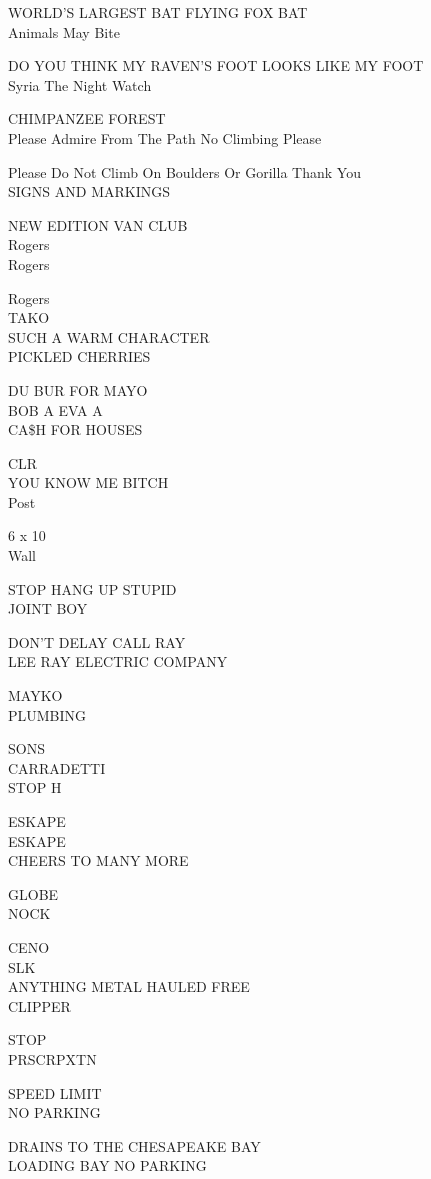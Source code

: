 \documentclass[10pt,letterpaper]{article}
\begin{document}
WORLD'S LARGEST BAT FLYING FOX BAT\\
Animals May Bite

DO YOU THINK MY RAVEN'S FOOT LOOKS LIKE MY FOOT\\
Syria The Night Watch

CHIMPANZEE FOREST\\
Please Admire From The Path No Climbing Please

Please Do Not Climb On Boulders Or Gorilla Thank You\\
SIGNS AND MARKINGS

NEW EDITION VAN CLUB\\
Rogers\\
Rogers

Rogers\\
TAKO\\
SUCH A WARM CHARACTER\\
PICKLED CHERRIES

DU BUR FOR MAYO\\
BOB A EVA A\\
CA\$H FOR HOUSES

CLR\\
YOU KNOW ME BITCH\\
Post

6 x 10\\
Wall

STOP HANG UP STUPID\\
JOINT BOY

DON'T DELAY CALL RAY\\
LEE RAY ELECTRIC COMPANY

MAYKO\\
PLUMBING

SONS\\
CARRADETTI\\
STOP H

ESKAPE\\
ESKAPE\\
CHEERS TO MANY MORE

GLOBE\\
NOCK

CENO\\
SLK\\
ANYTHING METAL HAULED FREE\\
CLIPPER

STOP\\
PRSCRPXTN

SPEED LIMIT\\
NO PARKING

DRAINS TO THE CHESAPEAKE BAY\\
LOADING BAY NO PARKING
\end{document}
